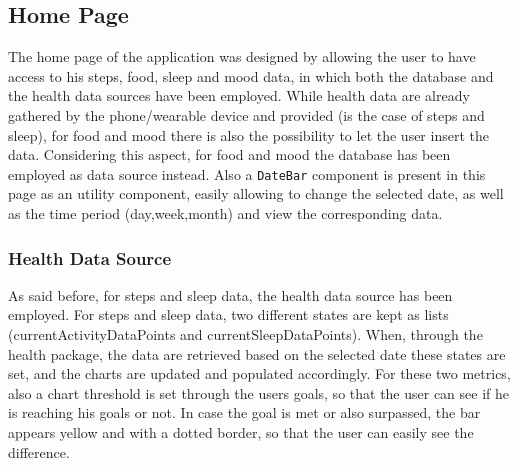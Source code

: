 \subsection{Home Page}
The home page of the application was designed by allowing the user to have access to his steps, food, sleep and mood data, in which both the database and the health data sources have been employed. While health data are already gathered by the phone/wearable device and provided (is the case of steps and sleep), for food and mood there is also the possibility to let the user insert the data. Considering this aspect, for food and mood the database has been employed as data source instead. Also a \texttt{DateBar} component is present in this page as an utility component, easily allowing to change the selected date, as well as the time period (day,week,month) and view the corresponding data.
\subsubsection{Health Data Source}
As said before, for steps and sleep data, the health data source has been employed. For steps and sleep data, two different states are kept as lists (currentActivityDataPoints and currentSleepDataPoints). When, through the health package, the data are retrieved based on the selected date these states are set, and the charts are updated and populated accordingly. For these two metrics, also a chart threshold is set through the users goals, so that the user can see if he is reaching his goals or not. In case the goal is met or also surpassed, the bar appears yellow and with a dotted border, so that the user can easily see the difference. 

